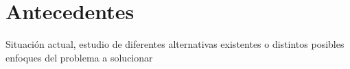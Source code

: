 \chapter{Antecedentes}
\newpage
Situación actual, estudio de diferentes alternativas 
existentes o distintos posibles enfoques del problema a solucionar